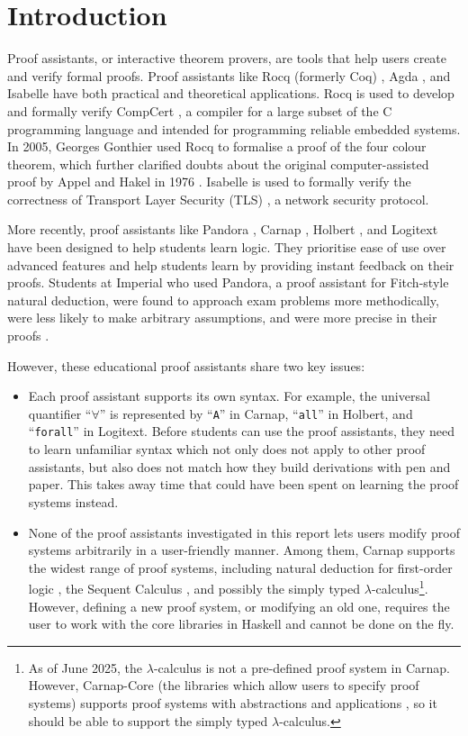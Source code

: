 \chapter{Introduction}
Proof assistants, or interactive theorem provers, are tools that help users create and verify formal proofs. Proof assistants like Rocq (formerly Coq) \cite{rocq}, Agda \cite{agda}, and Isabelle \cite{isabelle} have both practical and theoretical applications. Rocq is used to develop and formally verify CompCert \cite{leroy:2009}, a compiler for a large subset of the C programming language and intended for programming reliable embedded systems. In 2005, Georges Gonthier \cite{gonthier:2005} used Rocq to formalise a proof of the four colour theorem, which further clarified doubts about the original computer-assisted proof by Appel and Hakel in 1976 \cite{appel:1976}. Isabelle is used to formally verify the correctness of Transport Layer Security (TLS) \cite{paulson:1999}, a network security protocol.

More recently, proof assistants like Pandora \cite{pandora:2007, pandora}, Carnap \cite{carnap, carnap:2018}, Holbert \cite{oconnor:2022}, and Logitext \cite{yang:2022} have been designed to help students learn logic. They prioritise ease of use over advanced features and help students learn by providing instant feedback on their proofs. Students at Imperial who used Pandora, a proof assistant for Fitch-style \cite{fitch:1952} natural deduction, were found to approach exam problems more methodically, were less likely to make arbitrary assumptions, and were more precise in their proofs \cite{pandora:2007}.

However, these educational proof assistants share two key issues:
\begin{itemize}
    \item Each proof assistant supports its own syntax. For example, the universal quantifier ``$\forall$'' is represented by ``\lstinline{A}'' in Carnap, ``\lstinline{all}'' in Holbert, and ``\lstinline{forall}'' in Logitext. Before students can use the proof assistants, they need to learn unfamiliar syntax which not only does not apply to other proof assistants, but also does not match how they build derivations with pen and paper. This takes away time that could have been spent on learning the proof systems instead.
    \item None of the proof assistants investigated in this report lets users modify proof systems arbitrarily in a user-friendly manner. Among them, Carnap supports the widest range of proof systems, including natural deduction for first-order logic \cite{carnap:systems}, the Sequent Calculus \cite{carnap:systems}, and possibly the simply typed $\lambda$-calculus\footnote{As of June 2025, the $\lambda$-calculus is not a pre-defined proof system in Carnap. However, Carnap-Core (the libraries which allow users to specify proof systems) supports proof systems with abstractions and applications \cite{carnap:2018}, so it should be able to support the simply typed $\lambda$-calculus.}. However, defining a new proof system, or modifying an old one, requires the user to work with the core libraries in Haskell and cannot be done on the fly.
\end{itemize}

